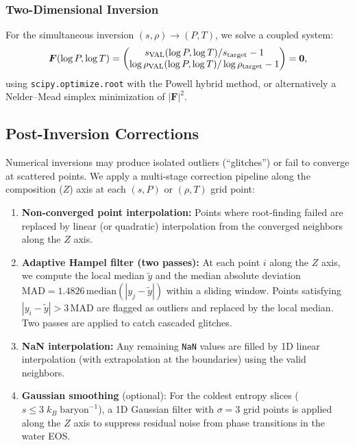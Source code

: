 \documentclass[twocolumn]{aastex701}
\begin{document}
\subsubsection{Two-Dimensional Inversion}

For the simultaneous inversion $(s, \rho) \to (P, T)$, we solve a coupled system:
\begin{equation}
    \bm{F}(\log P, \log T) = \begin{pmatrix} s_{\rm VAL}(\log P, \log T)/s_{\rm target} - 1 \\ \log\rho_{\rm VAL}(\log P, \log T)/\log\rho_{\rm target} - 1 \end{pmatrix} = \bm{0},
\end{equation}
using \texttt{scipy.optimize.root} with the Powell hybrid method, or alternatively a Nelder--Mead simplex minimization of $|\bm{F}|^2$.

\subsection{Post-Inversion Corrections}\label{sec:glitch}

Numerical inversions may produce isolated outliers (``glitches'') or fail to converge at scattered points.
We apply a multi-stage correction pipeline along the composition ($Z$) axis at each $(s,P)$ or $(\rho,T)$ grid point:

\begin{enumerate}
    \item \textbf{Non-converged point interpolation:} Points where root-finding failed are replaced by linear (or quadratic) interpolation from the converged neighbors along the $Z$ axis.

    \item \textbf{Adaptive Hampel filter (two passes):} At each point $i$ along the $Z$ axis, we compute the local median $\tilde{y}$ and the median absolute deviation $\mathrm{MAD} = 1.4826\,\mathrm{median}(|y_j - \tilde{y}|)$ within a sliding window.
    Points satisfying $|y_i - \tilde{y}| > 3\,\mathrm{MAD}$ are flagged as outliers and replaced by the local median.
    Two passes are applied to catch cascaded glitches.

    \item \textbf{NaN interpolation:} Any remaining \texttt{NaN} values are filled by 1D linear interpolation (with extrapolation at the boundaries) using the valid neighbors.

    \item \textbf{Gaussian smoothing} (optional): For the coldest entropy slices ($s \leq 3\;k_B\;\mathrm{baryon}^{-1}$), a 1D Gaussian filter with $\sigma=3$ grid points is applied along the $Z$ axis to suppress residual noise from phase transitions in the water EOS.
\end{enumerate}
\end{document}
